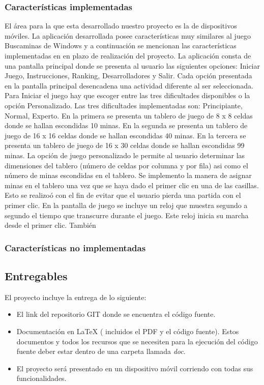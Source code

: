 \documentclass[11pt]{article} %
\begin{document}
\subsubsection{Caracter\' isticas implementadas}
El \'area para la que esta desarrollado nuestro proyecto es la de dispositivos m\'oviles.
La aplicaci\'on desarrollada posee caracter\'isticas muy similares al juego Buscaminas de Windows y a continuaci\'on se mencionan las caracter\'isticas implementadas en en plazo de realizaci\'on del proyecto.
La aplicaci\'on consta de una pantalla principal  donde se presenta al usuario las siguientes opciones: Iniciar Juego, Instrucciones, Ranking, Desarrolladores y Salir. Cada opci\'on presentada en la pantalla principal desencadena una actividad diferente al ser seleccionada.
Para Iniciar el juego hay que escoger entre las tres dificultades disponibles o la opci\'on Personalizado. Las tres dificultades implementadas son: Principiante, Normal, Experto. En la primera se presenta un tablero de juego de 8 x 8 celdas donde se hallan escondidas 10 minas. En la segunda se presenta un tablero de juego de 16 x 16 celdas donde se hallan escondidas 40 minas. En la tercera se presenta un tablero de juego de 16 x 30 celdas donde se hallan escondidas 99 minas. La opci\'on de juego personalizado le permite al usuario determinar las dimensiones del tablero (n\'umero de celdas por columna y por fila) asi como el n\'umero de minas escondidas en el tablero.
Se implemento la manera de asignar minas en el tablero una vez que se haya dado el primer clic en una de las casillas. Esto se realizo\' o con el fin de evitar que el usuario pierda una partida con el primer clic.
En la pantalla de juego se incluye un reloj que muestra segundo a segundo el tiempo que transcurre durante el juego. Este reloj inicia su marcha desde el primer clic.
Tambi\'en 
\subsubsection{Caracter\' isticas no implementadas}

\subsection{Entregables}
El proyecto incluye la entrega de lo siguiente:

\begin{itemize}
\item El link del repositorio GIT donde se encuentra el c\'odigo fuente.
\item Documentación en LaTeX ( incluidos el PDF y el c\'odigo fuente). Estos documentos y todos los recursos que se necesiten para la ejecuci\'on del c\'odigo fuente deber estar dentro de una carpeta llamada \textsl{doc}.
\item  El proyecto ser\'a presentado en un dispositivo m\'ovil corriendo con todas sus funcionalidades.
\end{itemize}
\end{document}
